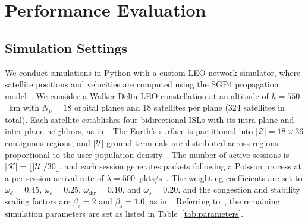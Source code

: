 \section{Performance Evaluation}
\label{sec:eval}

\subsection{Simulation Settings}
\label{sec:settings}

We conduct simulations in Python with a custom LEO network simulator, where satellite positions and velocities are computed using the SGP4 propagation model~\cite{wu2025enhancing}. We consider a Walker Delta LEO constellation at an altitude of $h = 550$~km with $N_p = 18$ orbital planes and 18 satellites per plane (324 satellites in total). Each satellite establishes four bidirectional ISLs with its intra-plane and inter-plane neighbors, as in~\cite{zhang2025grlr, yao2025leo}.
The Earth's surface is partitioned into $|\mathcal{Z}| = 18 \times 36$ contiguous regions, and $|\mathcal{U}|$ ground terminals are distributed across regions proportional to the user population density~\cite{liu2024enabling}. The number of active sessions is $|\mathcal{K}| = \lfloor |\mathcal{U}| / 30 \rfloor$, and each session generates packets following a Poisson process at a per-session arrival rate of $\lambda = 500$~pkts/s~\cite{ran2024fully}. The weighting coefficients are set to $\omega_d = 0.45$, $\omega_c = 0.25$, $\omega_{\mathrm{dir}} = 0.10$, and $\omega_s = 0.20$, and the congestion and stability scaling factors are $\beta_c = 2$ and $\beta_s = 1.0$, as in~\cite{chen2025distributed}. Referring to~\cite{schulman2017proximal}, the remaining simulation parameters are set as listed in Table~\ref{tab:parameters}.

